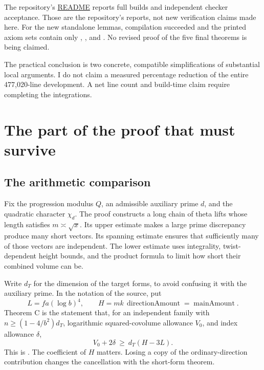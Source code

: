 The repository's \href{https://github.com/VladimirReshetnikov/ProveIt/blob/9050b04000647d588d0c78d945180abcd3b0bcf7/Analysis/GeneralizedRiemannHypothesis/Lean/grh/README.md}{README}
reports full builds and independent checker acceptance. Those are the
repository's reports, not new verification claims made here. For the new
standalone lemmas, compilation succeeded and the printed axiom sets contain
only , , and .
No revised proof of the five final theorems is being claimed.

The practical conclusion is two concrete, compatible simplifications of
substantial local arguments. I do not claim a measured percentage reduction
of the entire 477,020-line development. A net line count and build-time claim
require completing the integrations.

\section{The part of the proof that must survive}

\subsection{The arithmetic comparison}

Fix the progression modulus \(Q\), an admissible auxiliary prime \(d\), and the
quadratic character \(\chi_d\). The proof constructs a long chain of theta lifts
whose length satisfies \(m\asymp\sqrt{x}\). Its upper estimate makes a large
prime discrepancy produce many short vectors. Its spanning estimate ensures
that sufficiently many of those vectors are independent. The lower estimate
uses integrality, twist-dependent height bounds, and the product formula to
limit how short their combined volume can be.

Write \(d_T\) for the dimension of the target forms, to avoid confusing it
with the auxiliary prime. In the notation of the source, put
\[
 L=fa(\log b)^4,\qquad
 H=m k\,\operatorname{directionAmount}=\operatorname{mainAmount}.
\]
Theorem C is the statement that, for an independent family with
\(n\ge(1-4/b^2)d_T\), logarithmic squared-covolume allowance \(V_0\), and
index allowance \(\delta\),
\begin{equation}
 V_0+2\delta\ \ge\ d_T(H-3L).
 \label{eq:theoremC}
\end{equation}
This is
.
The coefficient of \(H\) matters. Losing a copy of the ordinary-direction
contribution changes the cancellation with the short-form theorem.


